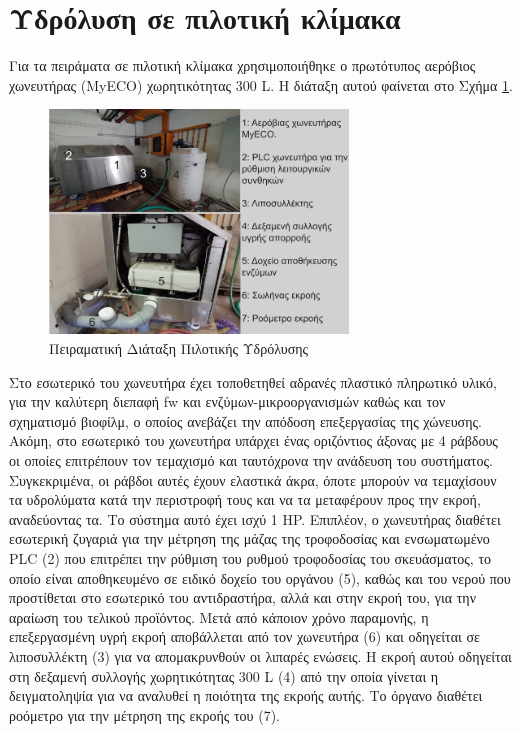 \documentclass[11pt]{report}
\begin{document}
\section{Υδρόλυση σε πιλοτική κλίμακα}
\label{sec:org49d0ab4}
\label{sec:pilot-exp}

Για τα πειράματα σε πιλοτική κλίμακα χρησιμοποιήθηκε ο πρωτότυπος αερόβιος χωνευτήρας (MyECO) χωρητικότητας 300 L. Η διάταξη αυτού φαίνεται στο Σχήμα \ref{fig:org87222e7}.

\begin{figure}[htbp]
\centering
\includegraphics[width=300px]{./pilot_hydrolysis_captioned.png}
\caption{\label{fig:org87222e7}Πειραματική Διάταξη Πιλοτικής Υδρόλυσης}
\end{figure}

Στο εσωτερικό του χωνευτήρα έχει τοποθετηθεί αδρανές πλαστικό πληρωτικό υλικό, για την καλύτερη διεπαφή \acrshort{fw} και ενζύμων-μικροοργανισμών καθώς και τον σχηματισμό βιοφίλμ, ο οποίος ανεβάζει την απόδοση επεξεργασίας της χώνευσης. Ακόμη, στο εσωτερικό του χωνευτήρα υπάρχει ένας οριζόντιος άξονας με 4 ράβδους οι οποίες επιτρέπουν τον τεμαχισμό και ταυτόχρονα την ανάδευση του συστήματος. Συγκεκριμένα, οι ράβδοι αυτές έχουν ελαστικά άκρα, όποτε μπορούν να τεμαχίσουν τα υδρολύματα κατά την περιστροφή τους και να τα μεταφέρουν προς την εκροή, αναδεύοντας τα. Το σύστημα αυτό έχει ισχύ 1 HP. Επιπλέον, ο χωνευτήρας διαθέτει εσωτερική ζυγαριά για την μέτρηση της μάζας της τροφοδοσίας και ενσωματωμένο PLC (2) που επιτρέπει την ρύθμιση του ρυθμού τροφοδοσίας του σκευάσματος, το οποίο είναι αποθηκευμένο σε ειδικό δοχείο του οργάνου (5), καθώς και του νερού που προστίθεται στο εσωτερικό του αντιδραστήρα, αλλά και στην εκροή του, για την αραίωση του τελικού προϊόντος. Μετά από κάποιον χρόνο παραμονής, η επεξεργασμένη υγρή εκροή αποβάλλεται από τον χωνευτήρα (6) και οδηγείται σε λιποσυλλέκτη (3) για να απομακρυνθούν οι λιπαρές ενώσεις. Η εκροή αυτού οδηγείται στη δεξαμενή συλλογής χωρητικότητας 300 L (4) από την οποία γίνεται η δειγματοληψία για να αναλυθεί η ποιότητα της εκροής αυτής. Το όργανο διαθέτει ροόμετρο για την μέτρηση της εκροής του (7).
\end{document}
